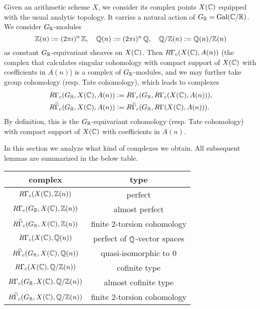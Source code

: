 \documentclass{article}
\numberwithin{equation}{section}
\begin{document}
Given an arithmetic scheme $X$, we consider its complex points $X (\mathbb{C})$ equipped
with the usual analytic topology. It carries a natural action of
$G_{\mathbb{R}} = \operatorname{Gal} (\mathbb{C}/\mathbb{R})$. We consider $G_{\mathbb{R}}$-modules
\[ \mathbb{Z} (n) \mathrel{\mathop:}= (2\pi i)^n\,\mathbb{Z}, \quad
\mathbb{Q} (n) \mathrel{\mathop:}= (2\pi i)^n\,\mathbb{Q}, \quad
\mathbb{Q}/\mathbb{Z} (n) \mathrel{\mathop:}= \mathbb{Q} (n) / \mathbb{Z} (n) \]
as constant $G_{\mathbb{R}}$-equivariant sheaves on $X (\mathbb{C})$. Then
$R\Gamma_c (X (\mathbb{C}), A (n))$ (the complex that calculates singular cohomology
with compact support of $X (\mathbb{C})$ with coefficients in $A (n)$) is a complex of
$G_{\mathbb{R}}$-modules, and we may further take group cohomology (resp. Tate
cohomology), which leads to complexes
\begin{align*}
  R\Gamma_c (G_{\mathbb{R}}, X (\mathbb{C}), A (n)) & \mathrel{\mathop:}= R\Gamma_c (G_{\mathbb{R}}, R\Gamma_c (X (\mathbb{C}), A (n))),\\
  R\widehat{\Gamma}_c (G_{\mathbb{R}}, X (\mathbb{C}), A (n)) & \mathrel{\mathop:}= R\widehat{\Gamma}_c (G_{\mathbb{R}}, R\Gamma (X (\mathbb{C}), A (n))).
\end{align*}
By definition, this is the $G_{\mathbb{R}}$-equivariant cohomology (resp. Tate
cohomology) with compact support of $X (\mathbb{C})$ with coefficients in $A (n)$.

In this section we analyze what kind of complexes we obtain. All subsequent
lemmas are summarized in the below table.

\begin{center}
  \renewcommand{\arraystretch}{1.5}
  \begin{tabular}{cc}
    \hline
    \textbf{complex} & \textbf{type} \\
    \hline
    $R\Gamma_c (X (\mathbb{C}), \mathbb{Z} (n))$ & perfect \\
    $R\Gamma_c (G_{\mathbb{R}}, X (\mathbb{C}), \mathbb{Z} (n))$ & almost perfect \\
    $R\widehat{\Gamma}_c (G_{\mathbb{R}}, X (\mathbb{C}), \mathbb{Z} (n))$ & finite $2$-torsion cohomology \\
    \hline
    $R\Gamma_c (X (\mathbb{C}), \mathbb{Q} (n))$ & perfect of $\mathbb{Q}$-vector spaces \\
    $R\widehat{\Gamma}_c (G_{\mathbb{R}}, X (\mathbb{C}), \mathbb{Q} (n))$ & quasi-isomorphic to $0$ \\
    \hline
    $R\Gamma_c (X (\mathbb{C}), \mathbb{Q}/\mathbb{Z} (n))$ & cofinite type \\
    $R\Gamma_c (G_{\mathbb{R}}, X (\mathbb{C}), \mathbb{Q}/\mathbb{Z} (n))$ & almost cofinite type \\
    $R\widehat{\Gamma}_c (G_{\mathbb{R}}, X (\mathbb{C}), \mathbb{Q}/\mathbb{Z} (n))$ & finite $2$-torsion cohomology \\
    \hline
  \end{tabular}
\end{center}
\end{document}
